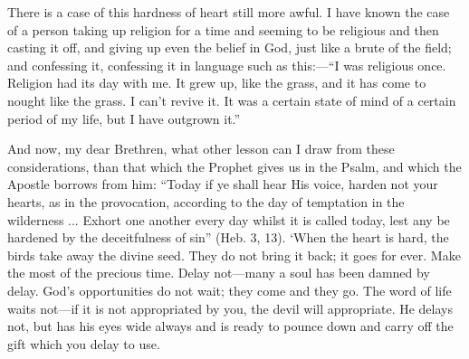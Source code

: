There is a case of this hardness of heart still
more awful. I have known the case of a person taking up religion for a
time and seeming to be religious and then casting it off, and giving
up even the belief in God, just like a brute of the field; and
confessing it, confessing it in language such as this:—``I was
religious once. Religion had its day with me. It grew up, like the
grass, and it has come to nought like the grass. I can't revive it. It
was a certain state of mind of a certain period of my life, but I have
outgrown it.''

And now, my dear Brethren, what other lesson can
I draw from these considerations, than that which the Prophet gives us
in the Psalm, and which the Apostle borrows from him: ``Today if
ye shall hear His voice, harden not your hearts, as in the
provocation, according to the day of temptation in the wilderness ...
Exhort one another every day whilst it is called today, lest any be
hardened by the deceitfulness of sin'' (Heb. 3, 13). ‘When the heart
is hard, the birds take away the divine seed. They do not bring it
back; it goes for ever. Make the most of the precious time. Delay
not—many a soul has been damned by delay. God's opportunities do not
wait; they come and they go. The word of life waits not—if it is not
appropriated by you, the devil will appropriate. He delays not, but
has his eyes wide always and is ready to pounce down and carry off the
gift which you delay to use.

